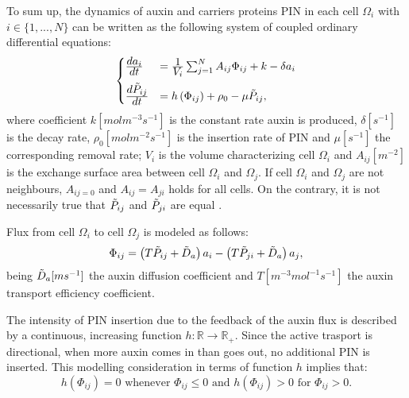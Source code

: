 To sum up, the dynamics of auxin and carriers proteins PIN in each cell $\Omega_i$ with $i \in \{ 1, ..., N \}$ can be written as the following system of coupled ordinary differential equations:
\begin{equation}\begin{aligned}
\begin{cases}
  {\displaystyle d a_i\over\displaystyle d t} & = {\displaystyle 1 \over \displaystyle V_i} \sum_{j=1}^{N} A_{ij} \Phi_{ij} +k - \delta a_i \\[8pt]
  {\displaystyle d \Tilde{P}_{ij}\over\displaystyle d t} & = h\left(\Phi_{ij}\right) + \rho_0 - \mu \Tilde{P}_{ij},
\end{cases}
\end{aligned} \end{equation}
where coefficient $ k [mol m^{-3} s^{-1}]$ is the constant rate auxin is produced, $ \delta [s^{-1}]$ is the decay rate, $\rho_0 [mol m^{-2} s^{-1}]$ is the insertion rate of PIN and $\mu [s^{-1}]$ the corresponding removal rate; $V_i$ is the volume characterizing cell $\Omega_i$ and $A_{ij}[m^{-2}]$ is the exchange surface area between cell $\Omega_i$ and $\Omega_j$. If cell $\Omega_i$ and $\Omega_j$ are not neighbours, $A_{ij = 0}$ and $A_{ij} = A_{ji}$ holds for all cells. On the contrary, it is not necessarily true that $\Tilde{P}_{ij}$  and $\Tilde{P}_{ji}$ are equal \cite{plant:Farcot, plant:Alim}.

Flux from cell $\Omega_i$ to cell $\Omega_j$ is modeled as follows:
\begin{equation}
  \Phi_{ij} = \left( T \Tilde{P}_{ij} + \Tilde{D}_a \right) a_i - \left( T \Tilde{P}_{ji} + \Tilde{D}_a \right) a_j,
\end{equation}
being $\Tilde{D}_a [ms^{-1}]$ the auxin diffusion coefficient and $T [m^{-3} mol^{-1} s^{-1}]$ the auxin transport efficiency coefficient.

The intensity of PIN insertion due to the feedback of the auxin flux is described by a continuous, increasing function $h: \mathds{R} \rightarrow \mathds{R}_+$. Since the active trasport is directional, when more auxin comes in than goes out, no additional PIN is inserted. This modelling consideration in terms of function $h$ implies that:
\begin{equation}
  h\left(\Phi_{ij}\right) = 0 \text{ whenever } \Phi_{ij} \leq 0 \text{ and } h\left(\Phi_{ij}\right) > 0 \text{ for } \Phi_{ij} > 0.
\end{equation}


